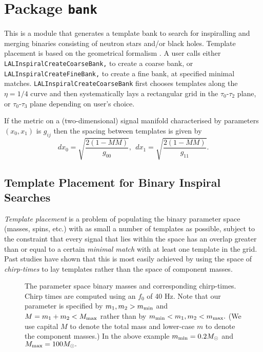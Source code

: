 \chapter{Package \texttt{bank}}

This is a module that generates a template bank to search for
inspiralling and merging binaries consisting of neutron stars
and/or black holes. Template placement is based on the geometrical
formalism \cite{Owen:96,OwenAndSathyaprakash:99}.  A user 
calls either \texttt{LALInspiralCreateCoarseBank,} 
to create a coarse bank, or \texttt{LALInspiralCreateFineBank,} 
to create a fine bank, at specified minimal matches.  
\texttt{LALInspiralCreateCoarseBank} first chooses templates
along the $\eta=1/4$ curve and then systematically lays a 
rectangular grid in the $\tau_0$-$\tau_2$ plane, or $\tau_0$-$\tau_3$
plane depending on user's choice.

If the metric on a (two-dimensional) signal manifold characterised 
by parameters $(x_0,x_1)$ is $g_{ij}$ then the spacing between templates 
is given by
\begin{equation}
   dx_0 = \sqrt{ \frac{2(1 -MM)}{g_{00}} },\ \ 
   dx_1 = \sqrt{ \frac{2(1 -MM)}{g_{11}} }.
\end{equation}
 
\section{Template Placement for Binary Inspiral Searches}
{\it Template placement} is a problem of populating the binary 
parameter space (masses, spins, etc.) with as small a number of 
templates as possible, subject to the constraint that every signal 
that lies within the space has an overlap greater 
than or equal to a certain {\it minimal match} with at least one template in 
the grid. Past studies \cite {Sathyaprakash and Dhurandhar 1991, Sathyaprakash 1994, OwenAndSathyaprakash:99}
have shown that this is most easily achieved by using the space of
{\it chirp-times} to lay templates rather than the space of component masses. 

\begin{figure}[h]
\caption{The parameter space binary masses and corresponding
chirp-times. Chirp times are computed using an $f_0$ of 40 Hz. Note
that our parameter is specified by $m_1, m_2 >m_{\rm min}$ and 
$M=m_1+m_2 < M_{\rm max}$ rather than by $m_{\rm min} < m_1,m_2 < m_{\rm max}.$
(We use capital $M$ to denote the total mass and lower-case $m$ to denote
the component masses.) In the above example $m_{\rm min} = 0.2 M_\odot$
and $M_{\rm max} = 100 M_\odot.$}
\label{fig:chirp-times}
\end{figure}

